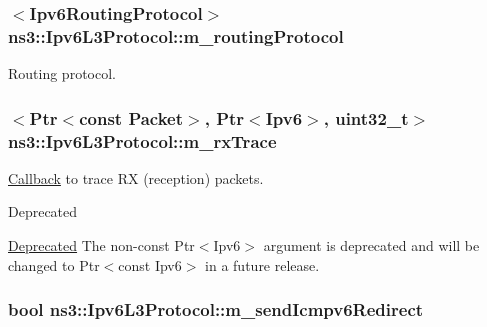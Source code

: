 \subsubsection[{\texorpdfstring{m\+\_\+routing\+Protocol}{m_routingProtocol}}]{$<${\bf Ipv6\+Routing\+Protocol}$>$ ns3\+::\+Ipv6\+L3\+Protocol\+::m\+\_\+routing\+Protocol\hspace{0.3cm}{\ttfamily [private]}}\hypertarget{classns3_1_1Ipv6L3Protocol_aa0df547e5240b218dc1f4742a2a00117}{}\label{classns3_1_1Ipv6L3Protocol_aa0df547e5240b218dc1f4742a2a00117}


Routing protocol. 

\subsubsection[{\texorpdfstring{m\+\_\+rx\+Trace}{m_rxTrace}}]{$<${\bf Ptr}$<$const {\bf Packet}$>$, {\bf Ptr}$<${\bf Ipv6}$>$, uint32\+\_\+t$>$ ns3\+::\+Ipv6\+L3\+Protocol\+::m\+\_\+rx\+Trace\hspace{0.3cm}{\ttfamily [private]}}\hypertarget{classns3_1_1Ipv6L3Protocol_a2fc8b57fc958fccd7c708f8c8ca03da5}{}\label{classns3_1_1Ipv6L3Protocol_a2fc8b57fc958fccd7c708f8c8ca03da5}


\hyperlink{classns3_1_1Callback}{Callback} to trace RX (reception) packets. 

\begin{DoxyRefDesc}{Deprecated}
\item[\hyperlink{deprecated__deprecated000014}{Deprecated}]The non-\/const {\ttfamily Ptr$<$\+Ipv6$>$} argument is deprecated and will be changed to {\ttfamily Ptr$<$const Ipv6$>$} in a future release. \end{DoxyRefDesc}
\subsubsection[{\texorpdfstring{m\+\_\+send\+Icmpv6\+Redirect}{m_sendIcmpv6Redirect}}]{\setlength{\rightskip}{0pt plus 5cm}bool ns3\+::\+Ipv6\+L3\+Protocol\+::m\+\_\+send\+Icmpv6\+Redirect\hspace{0.3cm}{\ttfamily [private]}}\hypertarget{classns3_1_1Ipv6L3Protocol_a23aef420bfb1d9dd634681c4a78a0352}{}\label{classns3_1_1Ipv6L3Protocol_a23aef420bfb1d9dd634681c4a78a0352}


